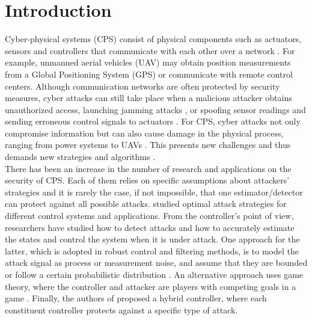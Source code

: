 \documentclass[twocolumn]{autart}    %
\newcommand{\rev}[1]{{\normalsize{{{\color{blue}#1}}}}}
\begin{document}
\section{Introduction}
\vspace{-0.4cm}
\rev{Cyber-physical systems (CPS) consist of physical components such as actuators, sensors and controllers that communicate with each other over a network \cite{kim2012cyber}}. For example, unmanned aerial vehicles (UAV) may obtain position measurements from a Global Positioning System (GPS) or communicate with remote control centers. Although communication networks are often protected by security measures, cyber attacks can still take place when a malicious attacker obtains unauthorized access, launching jamming attacks \cite{Gligor}, 
or spoofing sensor readings and sending erroneous control signals to actuators \cite{Mo}. For CPS, cyber attacks not only compromise information but can also cause damage in the physical process, \rev{ranging from power systems \cite{teixeira2010cyber, liu2011false} to UAVs \cite{hu2016uav}}. This presents new challenges and thus demands new strategies and algorithms \cite{Sastry}. \\
\rev{There has been an increase in the number of research and applications on the security of CPS}. Each of them relies on specific assumptions about attackers' strategies and it is rarely the case, if not impossible, that one estimator/detector can protect against all possible attacks. 
\cite{Tong}\cite{KwonACC}\cite{Reiter}\cite{Sastry2} studied optimal attack strategies for different control systems and applications. From the controller's point of view, researchers have studied how to detect attacks \cite{Blanke}\cite{Willsky} and how to accurately estimate the states and control the system when it is under attack. One approach for the latter, which is adopted in robust control and filtering methods, is to model the attack signal as process or measurement noise, and assume that they are bounded \cite{Zhou_Doyle} or follow a certain probabilistic distribution \cite{Bullo}\cite{Liu}.
An alternative approach uses game theory, where the controller and attacker are players with competing goals in a game \cite{Wu}\cite{Basar}\cite{Basar2}\cite{Walrand}\cite{Pappas}. Finally, the authors of \cite{KwonCDC} proposed a hybrid controller, where each constituent controller protects against a specific type of attack.\\
\end{document}

